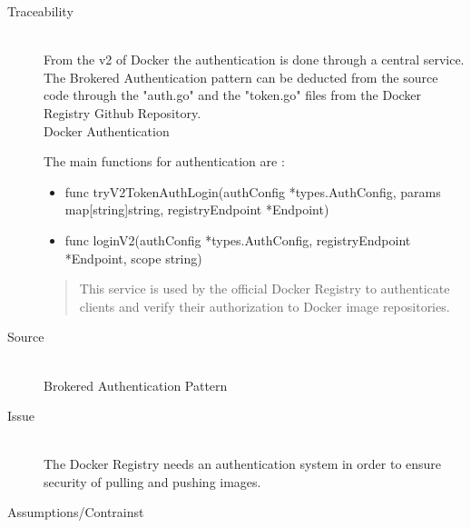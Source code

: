 \begin{description}

\item[Traceability]~\\
From the v2 of Docker the authentication is done through a central service. \\
The Brokered Authentication pattern can be deducted from the source code through the "auth.go" and the "token.go" files from the Docker Registry Github Repository. \\
Docker Authentication \cite{dockauth}

The main functions for authentication are : \\
\begin{itemize}
\item func tryV2TokenAuthLogin(authConfig *types.AuthConfig, params map[string]string, registryEndpoint *Endpoint)
\item func loginV2(authConfig *types.AuthConfig, registryEndpoint *Endpoint, scope string) 
\end{itemize}

\begin{quote}
This service is used by the official Docker Registry to authenticate clients and verify their authorization to Docker image repositories.
\end{quote}

\item[Source]~\\
Brokered Authentication Pattern\cite{brokeredauth} \\

\item[Issue]~\\ The Docker Registry needs an authentication system in order to ensure security of pulling and pushing images.

\item[Assumptions/Contrainst]~\\ 



\end{description}
